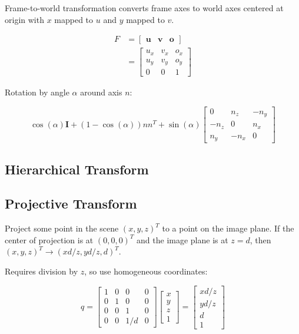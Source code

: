 \documentclass[10pt,landscape]{article}
\newcommand{\identity}{\mathbf{I}}
\begin{document}
\begin{multicols}{3}
Frame-to-world transformation converts frame axes to world axes centered at origin with $x$ mapped to $u$ and $y$ mapped to $v$.

\begin{align*}
    F &= \begin{bmatrix}
        \textbf{u} & \textbf{v} & \textbf{o}
    \end{bmatrix} \\
    &= \begin{bmatrix}
        u_x & v_x & o_x \\
        u_y & v_y & o_y \\
        0 & 0 & 1
    \end{bmatrix}
\end{align*}

Rotation by angle $\alpha$ around axis $n$:

$$\cos(\alpha)\identity + (1 - \cos(\alpha))nn^T + \sin(\alpha)\begin{bmatrix}
    0 & n_z & -n_y \\
    -n_z & 0 & n_x \\
    n_y & -n_x & 0
\end{bmatrix}$$

\subsection{Hierarchical Transform}

\subsection{Projective Transform}

Project some point in the scene $(x, y, z)^T$ to a point on the image plane. If the center of projection is at $(0, 0, 0)^T$ and the image plane is at $z = d$, then $(x, y, z)^T \rightarrow (xd/z, yd/z, d)^T$.

Requires division by $z$, so use homogeneous coordinates:

$$
q = \begin{bmatrix}
        1 & 0 & 0 & 0 \\
        0 & 1 & 0 & 0 \\
        0 & 0 & 1 & 0 \\
        0 & 0 & 1/d & 0
    \end{bmatrix}
    \begin{bmatrix}
        x \\
        y \\
        z \\
        1
    \end{bmatrix} =
    \begin{bmatrix}
        xd/z \\
        yd/z \\
        d \\
        1
    \end{bmatrix}
$$


\end{multicols}
\end{document}
